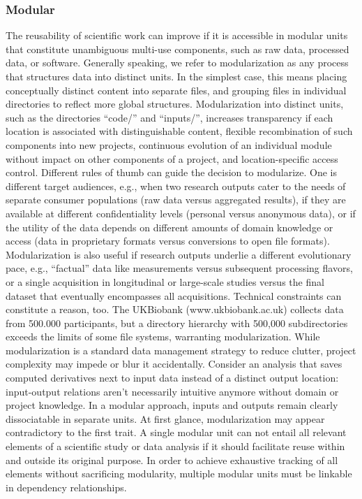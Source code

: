 \subsubsection{Modular}

The reusability of scientific work can improve if it is accessible in modular units that constitute unambiguous multi-use components, such as raw data, processed data, or software. Generally speaking, we refer to modularization as any process that structures data into distinct units. In the simplest case, this means placing conceptually distinct content into separate files, and grouping files in individual directories to reflect more global structures. Modularization into distinct units, such as the directories “code/” and “inputs/”, increases transparency if each location is associated with distinguishable content, flexible recombination of such components into new projects, continuous evolution of an individual module without impact on other components of a project, and location-specific access control. Different rules of thumb can guide the decision to modularize. One is different target audiences, e.g., when two research outputs cater to the needs of separate consumer populations (raw data versus aggregated results), if they are available at different confidentiality levels (personal versus anonymous data), or if the utility of the data depends on different amounts of domain knowledge or access (data in proprietary formats versus conversions to open file formats). Modularization is also useful if research outputs underlie a different evolutionary pace, e.g., “factual” data like measurements versus subsequent processing flavors, or a single acquisition in longitudinal or large-scale studies versus the final dataset that eventually encompasses all acquisitions. Technical constraints can constitute a reason, too. The UKBiobank (www.ukbiobank.ac.uk) collects data from 500.000 participants, but a directory hierarchy with 500,000 subdirectories exceeds the limits of some file systems, warranting modularization. While modularization is a standard data management strategy to reduce clutter, project complexity may impede or blur it accidentally. Consider an analysis that saves computed derivatives next to input data instead of a distinct output location: input-output relations aren’t necessarily intuitive anymore without domain or project knowledge. In a modular approach, inputs and outputs remain clearly dissociatable in separate units.
At first glance, modularization may appear contradictory to the first trait. A single modular unit can not entail all relevant elements of a scientific study or data analysis if it should facilitate reuse within and outside its original purpose. In order to achieve exhaustive tracking of all elements without sacrificing modularity, multiple modular units must be linkable in dependency relationships.

